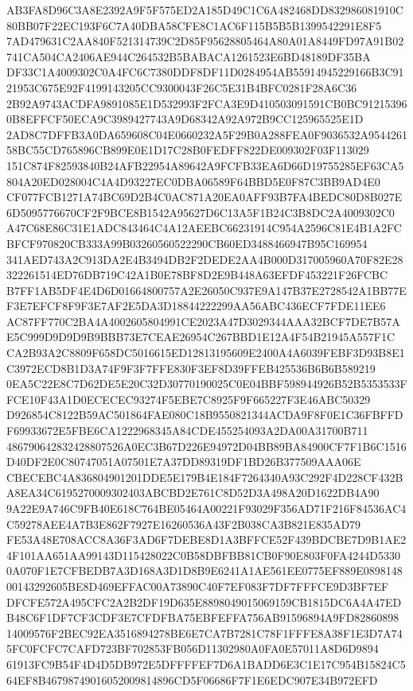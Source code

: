 \documentclass[UTF8,fontset=fandol,zihao=-4,a4paper]{ctexart}
\begin{document}
{{AB3FA8D96C3A8E2392A9F5F575ED2A185D49C1C6A482468DD832986081910C80BB07F22EC193F6C7A40DBA58CFE8C1AC6F115B5B5B1399542291E8F5
7AD479631C2AA840F521314739C2D85F95628805464A80A01A8449FD97A91B02741CA504CA2406AE944C264532B5BABACA1261523E6BD48189DF35BA
DF33C1A4009302C0A4FC6C7380DDF8DF11D0284954AB55914945229166B3C9121953C675E92F4199143205CC9300043F26C5E31B4BFC0281F28A6C36
2B92A9743ACDFA9891085E1D532993F2FCA3E9D410503091591CB0BC912153960B8EFFCF50ECA9C3989427743A9D68342A92A972B9CC125965525E1D
2AD8C7DFFB3A0DA659608C04E0660232A5F29B0A288FEA0F9036532A954426158BC55CD765896CB899E0E1D17C28B0FEDFF822DE009302F03F113029
151C874F82593840B24AFB22954A89642A9FCFB33EA6D66D19755285EF63CA5804A20ED028004C4A4D93227EC0DBA06589F64BBD5E0F87C3BB9AD4E0
CF077FCB1271A74BC69D2B4C0AC871A20EA0AFF93B7FA4BEDC80D8B027E6D5095776670CF2F9BCE8B1542A95627D6C13A5F1B24C3B8DC2A4009302C0
A47C68E86C31E1ADC843464C4A12AEEBC66231914C954A2596C81E4B1A2FCBFCF970820CB333A99B03260560522290CB60ED3488466947B95C169954
341AED743A2C913DA2E4B3494DB2F2DEDE2AA4B000D317005960A70F82E28322261514ED76DB719C42A1B0E78BF8D2E9B448A63EFDF453221F26FCBC
B7FF1AB5DF4E4D6D01664800757A2E26050C937E9A147B37E2728542A1BB77EF3E7EFCF8F9F3E7AF2E5DA3D18844222299AA56ABC436ECF7FDE11EE6
AC87FF770C2BA4A4002605804991CE2023A47D3029344AAA32BCF7DE7B57AE5C999D9D9D9B9BBB73E7CEAE26954C267BBD1E12A4F54B21945A557F1C
CA2B93A2C8809F658DC5016615ED12813195609E2400A4A6039FEBF3D93B8E1C3972ECD8B1D3A74F9F3F7FFE830F3EF8D39FFEB425536B6B6B589219
0EA5C22E8C7D62DE5E20C32D30770190025C0E04BBF598944926B52B5353533FFCE10F43A1D0ECECEC93274F5EBE7C8925F9F665227F3E46ABC50329
D926854C8122B59AC501864FAE080C18B9550821344ACDA9F8F0E1C36FBFFDF69933672E5FBE6CA1222968345A84CDE455254093A2DA00A31700B711
486790642832428807526A0EC3B67D226E94972D04BB89BA84900CF7F1B6C1516D40DF2E0C80747051A07501E7A37DD89319DF1BD26B377509AAA06E
CBECEBC4A836804901201DDE5E179B4E184F7264340A93C292F4D228CF432BA8EA34C6195270009302403ABCBD2E761C8D52D3A498A20D1622DB4A90
9A22E9A746C9FB40E618C764BE05464A00221F93029F356AD71F216F84536AC4C59278AEE4A7B3E862F7927E16260536A43F2B038CA3B821E835AD79
FE53A48E708ACC8A36F3AD6F7DEBE8D1A3BFFCE52F439BDCBE7D9B1AE24F101AA651AA99143D115428022C0B58DBFBB81CB0F90E803F0FA4244D5330
0A070F1E7CFBEDB7A3D168A3D1D8B9E6241A1AE561EE0775EF889E089814800143292605BE8D469EFFAC00A73890C40F7EF083F7DF7FFFCE9D3BF7EF
DFCFE572A495CFC2A2B2DF19D635E8898049015069159CB1815DC6A4A47EDB48C6F1DF7CF3CDF3E7CFDFBA75EBFEFFA756AB91596894A9FD82860898
14009576F2BEC92EA3516894278BE6E7CA7B7281C78F1FFFE8A38F1E3D7A745FC0FCFC7CAFD723BF702853FB056D11302980A0FA0E57011A8D6D9894
61913FC9B54F4D4D5DB972E5DFFFFEF7D6A1BADD6E3C1E17C954B15824C564EF8B46798749016052009814896CD5F06686F7F1E6EDC907E34B972EFD
}}
\end{document}
